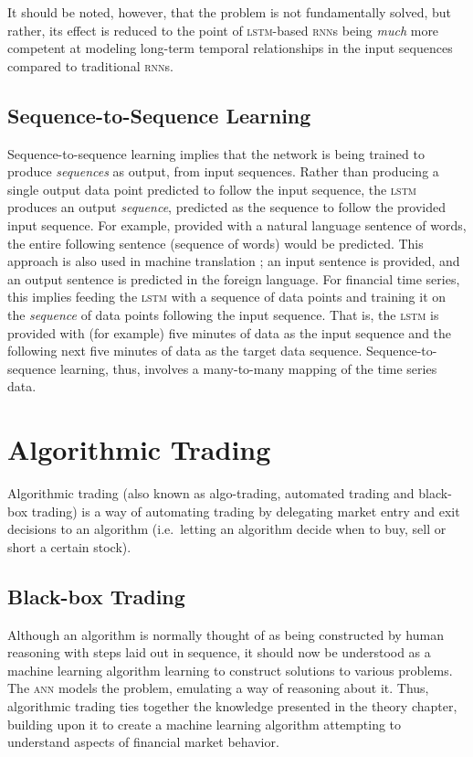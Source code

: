 \begin{multicols}{2}
It should be noted, however, that the problem is not fundamentally solved, but
rather, its effect is reduced to the point of \textsc{lstm}-based \textsc{rnn}s
being \textit{much} more competent at modeling long-term temporal relationships
in the input sequences compared to traditional \textsc{rnn}s.

\subsection{Sequence-to-Sequence Learning}

Sequence-to-sequence learning implies that the network is being trained to
produce \textit{sequences} as output, from input sequences.  Rather than
producing a single output data point predicted to follow the input sequence, the
\textsc{lstm} produces an output \textit{sequence}, predicted as the sequence to
follow the provided input sequence.  For example, provided with a natural
language sentence of words, the entire following sentence (sequence of words)
would be predicted.  This approach is also used in machine translation
\citep{sutskever2014sequence}; an input sentence is provided, and an output
sentence is predicted in the foreign language.  For financial time series, this
implies feeding the \textsc{lstm} with a sequence of data points and training it
on the \textit{sequence} of data points following the input sequence.  That is,
the \textsc{lstm} is provided with (for example) five minutes of data as the
input sequence and the following next five minutes of data as the target data
sequence.  Sequence-to-sequence learning, thus, involves a many-to-many mapping
of the time series data.

\section{Algorithmic Trading}

Algorithmic trading (also known as algo-trading, automated trading and black-box
trading) is a way of automating trading by delegating market entry and exit
decisions to an algorithm (i.e.\ letting an algorithm decide when to buy, sell or
short a certain stock).

\subsection{Black-box Trading}

Although an algorithm is normally thought of as being constructed by human
reasoning with steps laid out in sequence, it should now be understood as a
machine learning algorithm learning to construct solutions to various
problems. The \textsc{ann} models the problem, emulating a way of reasoning
about it. Thus, algorithmic trading ties together the knowledge presented in the
theory chapter, building upon it to create a machine learning algorithm
attempting to understand aspects of financial market behavior.


\end{multicols}
